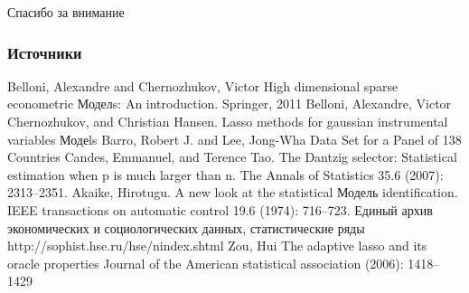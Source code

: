 \documentclass[c, dvipsnames]{beamer}  %
\begin{document}
\begin{frame}[c, plain]
\begin{center}

{\LARGE Спасибо за внимание}

\bigskip

{\Large \inserttitle}

\bigskip

{\insertauthor} 

\bigskip

\bigskip\bigskip

{\large \insertdate}
\end{center}
\end{frame}



\begin{frame}[c, plain, shrink = 30]
  \frametitle{Источники}    
  \begin{thebibliography}{8}    
  \beamertemplatearticlebibitems

    Belloni, Alexandre and Chernozhukov, Victor
    \newblock High dimensional sparse econometric Моделs: An introduction.
    \newblock Springer, 2011
   Belloni, Alexandre, Victor Chernozhukov, and Christian Hansen. 
   \newblock Lasso methods for gaussian instrumental variables Модеls
    Barro, Robert J.  and Lee, Jong-Wha 
    \newblock Data Set for a Panel of 138 Countries
     Candes, Emmanuel, and Terence Tao. 
    \newblock The Dantzig selector: Statistical estimation when p is much larger than n.
    \newblock The Annals of Statistics 35.6 (2007): 2313--2351.
     Akaike, Hirotugu.
    \newblock A new look at the statistical Модель identification.
    \newblock IEEE transactions on automatic control 19.6 (1974): 716--723.
    Единый архив экономических и социологических данных, статистические ряды
    \newblock http://sophist.hse.ru/hse/nindex.shtml
    Zou, Hui
    \newblock The adaptive lasso and its oracle properties
    \newblock Journal of the American statistical association (2006): 1418--1429
  \end{thebibliography}
\end{frame}
\end{document}
